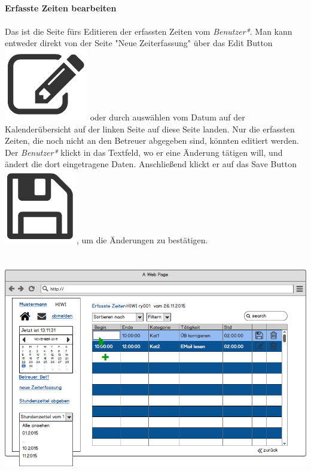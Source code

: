 \newpage
\textbf{\\Erfasste Zeiten bearbeiten}\\
\\
Das ist die Seite fürs Editieren der erfassten Zeiten vom \emph{Benutzer*}.
Man kann entweder direkt von der Seite "Neue Zeiterfassung" über das Edit Button \includegraphics[scale=.2]{UI/Button/Edit.png} oder durch auswählen vom Datum auf der Kalenderübersicht auf der linken Seite auf diese Seite landen. Nur die erfassten Zeiten, die noch nicht an den Betreuer abgegeben sind, könnten editiert werden.\\
Der \emph{Benutzer*} klickt in das Textfeld, wo er eine Änderung tätigen will, und ändert die dort eingetragene Daten. Anschließend klickt er auf das Save Button\includegraphics[scale=.2]{UI/Button/Save.png}, um die Änderungen zu bestätigen.\\
\\
\\
\includegraphics[width=\linewidth]{UI/Benutzer/Editieren.png}






